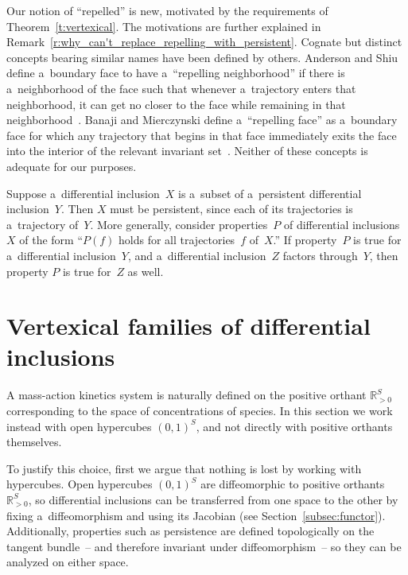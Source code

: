 \begin{Remark}
\label{r:repelled}
Our notion of ``repelled'' is new, motivated by the requirements of Theorem~\ref{t:vertexical}.
The motivations are further explained in Remark~\ref{r:why_can't_replace_repelling_with_persistent}.
Cognate but distinct concepts bearing similar names have been def\/ined by others.
Anderson and Shiu def\/ine a~boundary face to have a~``repelling neighborhood'' if there is a~neighborhood of the face
such that whenever a~trajectory enters that neighborhood, it can get no closer to the face while remaining in that
neighborhood~\cite{AndersonShiu10}.
Banaji and Mierczynski def\/ine a~``repelling face'' as a~boundary face for which any trajectory that begins in that
face immediately exits the face into the interior of the relevant invariant set~\cite{BanajiMier}.
Neither of these concepts is adequate for our purposes.
\end{Remark}
\begin{Remark}
\label{r:subsetTrajectory}
Suppose a~dif\/ferential inclusion~$X$ is a~subset of a~persistent dif\/ferential inclusion~$Y$.
Then $X$ must be persistent, since each of its trajectories is a~trajectory of~$Y$.
More generally, consider properties~$P$ of dif\/ferential inclusions~$X$ of the form ``$P(f)$ holds for all
trajectories~$f$ of~$X$.'' If property~$P$ is true for a~dif\/ferential inclusion~$Y$, and a~dif\/ferential
inclusion~$Z$ factors through~$Y$, then property $P$ is true for~$Z$ as well.
\end{Remark}

\section{Vertexical families of dif\/ferential inclusions}
\label{s:vertexical}

A mass-action kinetics system is naturally def\/ined on the positive orthant $\mathbb{R}_{>0}^S$ corresponding to the
space of concentrations of species.
In this section we work instead with open hypercubes $(0,1)^S$, and not directly with positive orthants themselves.

To justify this choice, f\/irst we argue that nothing is lost by working with hypercubes.
Open hypercubes $(0,1)^S$ are dif\/feomorphic to positive orthants $\mathbb{R}_{>0}^S$, so dif\/ferential inclusions can
be transferred from one space to the other by f\/ixing a~dif\/feomorphism and using its Jacobian (see
Section~\ref{subsec:functor}).
Additionally, properties such as persistence are def\/ined topologically on the tangent bundle~-- and therefore
invariant under dif\/feomorphism~-- so they can be analyzed on either space.

